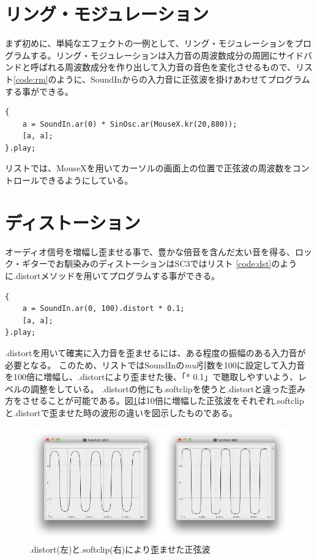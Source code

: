 \documentclass{jsarticle}
\begin{document}
\section{リング・モジュレーション}
まず初めに、単純なエフェクトの一例として、リング・モジュレーションをプログラムする。リング・モジュレーションは入力音の周波数成分の周囲にサイドバンドと呼ばれる周波数成分を作り出して入力音の音色を変化させるもので、リスト\ref{code:rm}のように、SoundInからの入力音に正弦波を掛けあわせてプログラムする事ができる。

\begin{lstlisting}[caption=リング・モジュレーション,label=code:rm]
{
	a = SoundIn.ar(0) * SinOsc.ar(MouseX.kr(20,880));
	[a, a];
}.play;
\end{lstlisting}

リストでは、MouseXを用いてカーソルの画面上の位置で正弦波の周波数をコントロールできるようにしている。

\section{ディストーション}
オーディオ信号を増幅し歪ませる事で、豊かな倍音を含んだ太い音を得る、ロック・ギターでお馴染みのディストーションはSC3ではリスト
\ref{code:dst}のように.distortメソッドを用いてプログラムする事ができる。

\begin{lstlisting}[caption=ディストーション, label=code:dst]
{
	a = SoundIn.ar(0, 100).distort * 0.1;
	[a, a];
}.play;
\end{lstlisting}

.distortを用いて確実に入力音を歪ませるには、ある程度の振幅のある入力音が必要となる。
このため、リストではSoundInの{\it mul}引数を100に設定して入力音を100倍に増幅し、.distortにより歪ませた後、「* 0.1」で聴取しやすいよう、レベルの調整をしている。
.distortの他にも.softclipを使うと.distortと違った歪み方をさせることが可能である。図\ref{fig:comparison}は10倍に増幅した正弦波をそれぞれ.softclipと.distortで歪ませた時の波形の違いを図示したものである。

\begin{figure}[htbp]
	\begin{center}
		\includegraphics[scale=0.6]{comparison.pdf}
	\end{center}
	\caption{.distort(左)と.softclip(右)により歪ませた正弦波}
	\label{fig:comparison}
\end{figure}
\end{document}
